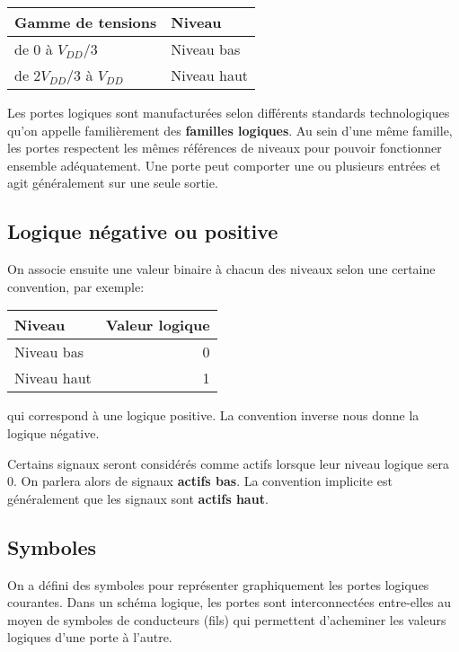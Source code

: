 \documentclass[11pt]{article}
\begin{document}
\begin{center}
\begin{tabular}{ll}
Gamme de tensions & Niveau\\
\hline
de 0 à  \(V_{DD}/3\) & Niveau bas\\
de \(2V_{DD}/3\) à  \(V_{DD}\) & Niveau haut\\
\end{tabular}
\end{center}

Les portes logiques sont manufacturées selon différents standards
technologiques qu'on appelle familièrement des \textbf{familles logiques}. Au
sein d'une même famille, les portes respectent les mêmes références de
niveaux pour pouvoir fonctionner ensemble adéquatement. Une porte peut
comporter une ou plusieurs entrées et agit généralement sur une seule
sortie.

\subsection{Logique négative ou positive}
\label{sec:org7d669b2}

On associe ensuite une valeur binaire à chacun des niveaux selon une
certaine convention, par exemple:
\begin{center}
\begin{tabular}{lr}
Niveau & Valeur logique\\
\hline
Niveau bas & 0\\
Niveau haut & 1\\
\end{tabular}
\end{center}
qui correspond à une logique positive. La convention inverse nous
donne la logique négative.

Certains signaux seront considérés comme actifs lorsque leur niveau
logique sera 0. On parlera alors de signaux \textbf{actifs bas}. La
convention implicite est généralement que les signaux sont \textbf{actifs
haut}.

\subsection{Symboles}
\label{sec:orgc13c041}

On a défini des symboles pour représenter graphiquement les portes
logiques courantes. Dans un schéma logique, les portes sont
interconnectées entre-elles au moyen de symboles de conducteurs
(fils) qui permettent d'acheminer les valeurs logiques d'une porte à
l'autre.
\end{document}
